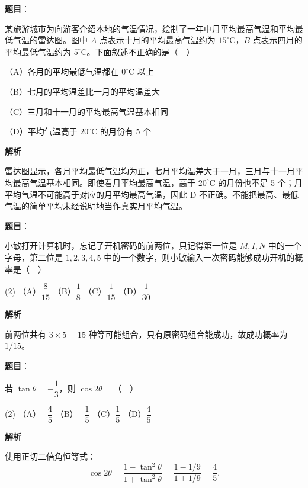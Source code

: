 \begin{answer}

\textbf{题目}：

某旅游城市为向游客介绍本地的气温情况，绘制了一年中月平均最高气温和平均最低气温的雷达图。图中 \(A\) 点表示十月的平均最高气温约为 \(15^\circ\mathrm C\)，\(B\) 点表示四月的平均最低气温约为 \(5^\circ\mathrm C\)。下面叙述不正确的是（　）
\nopagebreak[4]
\begin{center}\end{center}
\nopagebreak[4]
（A）各月的平均最低气温都在 \(0^\circ\mathrm C\) 以上

（B）七月的平均温差比一月的平均温差大

（C）三月和十一月的平均最高气温基本相同

（D）平均气温高于 \(20^\circ\mathrm C\) 的月份有 5 个

\textbf{解析}

雷达图显示，各月平均最低气温均为正，七月平均温差大于一月，三月与十一月平均最高气温基本相同。即使看月平均最高气温，高于 \(20^\circ\mathrm C\) 的月份也不足 5 个；月平均气温不可能高于对应的月平均最高气温，因此 D 不正确。不能把最高、最低气温的简单平均未经说明地当作真实月平均气温。


\end{answer}
\begin{answer}

\textbf{题目}：

小敏打开计算机时，忘记了开机密码的前两位，只记得第一位是 \(M,I,N\) 中的一个字母，第二位是 \(1,2,3,4,5\) 中的一个数字，则小敏输入一次密码能够成功开机的概率是（　）

\begin{gkopts}(2)
\task （A）\(\dfrac8{15}\)
\task （B）\(\dfrac18\)
\task （C）\(\dfrac1{15}\)
\task （D）\(\dfrac1{30}\)
\end{gkopts}

\textbf{解析}

前两位共有 \(3\times5=15\) 种等可能组合，只有原密码组合能成功，故成功概率为 \(1/15\)。


\end{answer}
\begin{answer}

\textbf{题目}：

若 \(\tan\theta=-\dfrac13\)，则 \(\cos2\theta=\)（　）

\begin{gkopts}(2)
\task （A）\(-\dfrac45\)
\task （B）\(-\dfrac15\)
\task （C）\(\dfrac15\)
\task （D）\(\dfrac45\)
\end{gkopts}

\textbf{解析}

使用正切二倍角恒等式：
\nopagebreak[4]
\[
\cos2\theta=\frac{1-\tan^2\theta}{1+\tan^2\theta}
=\frac{1-1/9}{1+1/9}=\frac45.
\]


\end{answer}

